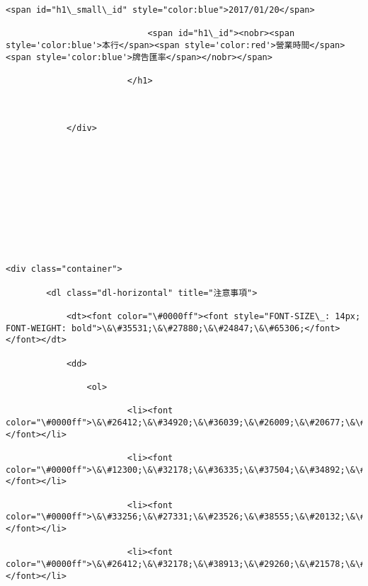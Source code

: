 \documentclass[11pt]{article}
\begin{document}
\begin{Verbatim}[commandchars=\\\{\}]
                            <span id="h1\_small\_id" style="color:blue">2017/01/20</span>

                            <span id="h1\_id"><nobr><span style='color:blue'>本行</span><span style='color:red'>營業時間</span><span style='color:blue'>牌告匯率</span></nobr></span>

                        </h1>



            </div>







            



<div class="container">

        <dl class="dl-horizontal" title="注意事項">

            <dt><font color="\#0000ff"><font style="FONT-SIZE\_: 14px; FONT-WEIGHT: bold">\&\#35531;\&\#27880;\&\#24847;\&\#65306;</font> </font></dt>

            <dd>

                <ol>

                        <li><font color="\#0000ff">\&\#26412;\&\#34920;\&\#36039;\&\#26009;\&\#20677;\&\#20379;\&\#21443;\&\#32771;\&\#65292;\&\#19981;\&\#20195;\&\#34920;\&\#23526;\&\#38555;\&\#20132;\&\#26131;\&\#21295;\&\#29575;\&\#12290; </font></li>

                        <li><font color="\#0000ff">\&\#12300;\&\#32178;\&\#36335;\&\#37504;\&\#34892;\&\#12301;\&\#21450;\&\#12300;Easy\&\#36092;\&\#32218;\&\#19978;\&\#30003;\&\#36092;\&\#29694;\&\#37396;\&\#25110;\&\#26053;\&\#25903;\&\#12301;\&\#20043;\&\#23526;\&\#38555;\&\#20132;\&\#26131;\&\#21295;\&\#29575;\&\#65292;\&\#20197;\&\#20132;\&\#26131;\&\#26178;\&\#39023;\&\#31034;\&\#20043;\&\#21295;\&\#29575;\&\#28858;\&\#28310;\&\#12290; </font></li>

                        <li><font color="\#0000ff">\&\#33256;\&\#27331;\&\#23526;\&\#38555;\&\#20132;\&\#26131;\&\#21295;\&\#29575;\&\#20197;\&\#20132;\&\#26131;\&\#26178;\&\#26412;\&\#34892;\&\#21295;\&\#29575;\&\#28858;\&\#28310;\&\#12290; </font></li>

                        <li><font color="\#0000ff">\&\#26412;\&\#32178;\&\#38913;\&\#29260;\&\#21578;\&\#21295;\&\#29575;\&\#36039;\&\#35338;\&\#28858;\&\#38748;\&\#24907;\&\#39023;\&\#31034;\&\#65292;\&\#39023;\&\#31034;\&\#20043;\&\#29260;\&\#21578;\&\#21295;\&\#29575;\&\#36039;\&\#35338;\&\#19981;\&\#26371;\&\#38568;\&\#24460;\&\#32396;\&\#30064;\&\#21205;\&\#32780;\&\#33258;\&\#21205;\&\#26356;\&\#26032;\&\#36039;\&\#35338;\&\#65292;\&\#27442;\&\#24471;\&\#30693;\&\#26412;\&\#34892;\&\#26368;\&\#26032;\&\#29260;\&\#21578;\&\#21295;\&\#29575;\&\#36039;\&\#35338;\&\#35531;\&\#25353;\&\#12300;\&\#21462;\&\#24471;\&\#26368;\&\#26032;\&\#22577;\&\#20729;\&\#12301;\&\#37397;\&\#12290; </font></li>


\end{Verbatim}
\end{document}
